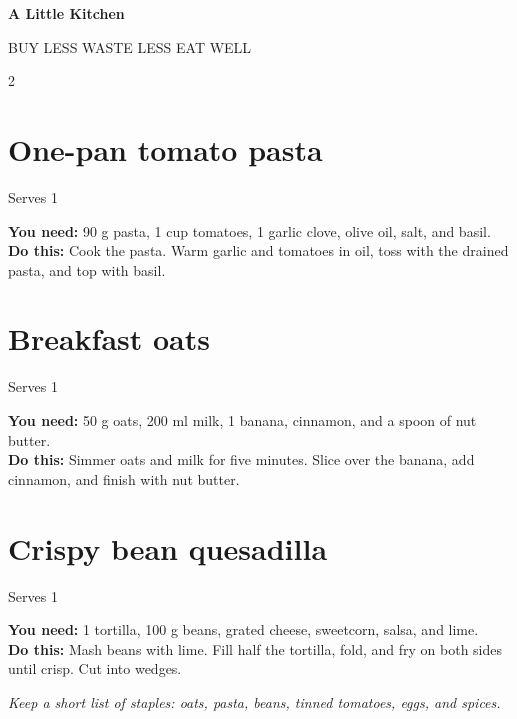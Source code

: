 \documentclass[10pt,a5paper]{article}
\newcommand{\quickrecipe}[3]{\section*{\color{blueberry}#1}\textcolor{sun}{#2}\par\smallskip #3\par\medskip}
\begin{document}
\begin{center}{\Huge\sffamily\bfseries\color{blueberry} A Little Kitchen}\par{}\par\vspace{3mm}\textcolor{sun}{BUY LESS \quad WASTE LESS \quad EAT WELL}\end{center}
\bigskip
\begin{multicols}{2}
\quickrecipe{One-pan tomato pasta}{Serves 1}{%
  \textbf{You need:} 90 g pasta, 1 cup tomatoes, 1 garlic clove, olive oil, salt, and basil.\\[2pt]
  \textbf{Do this:} Cook the pasta. Warm garlic and tomatoes in oil, toss with the drained pasta, and top with basil.}
\quickrecipe{Breakfast oats}{Serves 1}{%
  \textbf{You need:} 50 g oats, 200 ml milk, 1 banana, cinnamon, and a spoon of nut butter.\\[2pt]
  \textbf{Do this:} Simmer oats and milk for five minutes. Slice over the banana, add cinnamon, and finish with nut butter.}
\quickrecipe{Crispy bean quesadilla}{Serves 1}{%
  \textbf{You need:} 1 tortilla, 100 g beans, grated cheese, sweetcorn, salsa, and lime.\\[2pt]
  \textbf{Do this:} Mash beans with lime. Fill half the tortilla, fold, and fry on both sides until crisp. Cut into wedges.}
\end{multicols}
\vfill\begin{center}\small\textit{Keep a short list of staples: oats, pasta, beans, tinned tomatoes, eggs, and spices.}\end{center}
\end{document}
